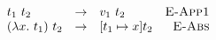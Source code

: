 \begin{minipage}{2.5in}
  \begin{math}
    \begin{array}{lclr}
      t_1\ t_2 & \rightarrow & v_1\ t_2 & \text{\sc E-App1} \\
      (\lambda x.\ t_1)\ t_2 & \rightarrow & [t_1 \mapsto x] t_2 & \text{\sc E-Abs}
    \end{array}
  \end{math}
\end{minipage}
